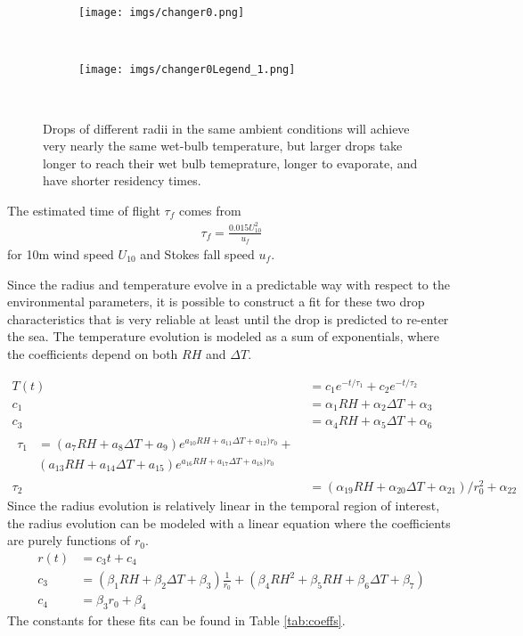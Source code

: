 \documentclass[10pt,a4paper]{article}
\begin{document}
\begin{figure}[h!]
    \centering
    \begin{subfigure}[t!]{0.75\textwidth}
        \texttt{[image: imgs/changer0.png]}        
    \end{subfigure}
    ~ %
    \begin{subfigure}[t!]{0.2\textwidth}
        \texttt{[image: imgs/changer0Legend\_1.png]}        
    \end{subfigure}
    ~ %
       \caption{Drops of different radii in the same ambient conditions will achieve very nearly the same wet-bulb temperature, but larger drops take longer to reach their wet bulb temeprature, longer to evaporate, and have shorter residency times. \label{fig:changer0}}
\end{figure}

The estimated time of flight $\tau_f$ comes from \citet{Andreas1992} 
\begin{align}
\tau_f = \frac{0.015 U_{10}^2}{u_f} \label{eq:tauf}
\end{align}
for 10m wind speed $U_{10}$ and Stokes fall speed $u_f$. \par 
Since the radius and temperature evolve in a predictable way with respect to the environmental parameters, it is possible to construct a fit for these two drop characteristics that is very reliable at least until the drop is predicted to re-enter the sea. The temperature evolution is modeled as a sum of exponentials, where the coefficients depend on both $RH$ and $\Delta T$.

\begin{align}
T(t) &= c_1e^{-t/\tau_1}+c_2e^{-t/\tau_2} \\
c_1 &= \alpha_1 RH + \alpha_2 \Delta T + \alpha_3 \\
c_3 &= \alpha_4 RH + \alpha_5 \Delta T + \alpha_6  \\
\begin{split}
\tau_1 &= (a_7RH+a_8 \Delta T+a_9) e^{a_{10}RH+a_{11}\Delta T+a_{12})r_0}+\\
&(a_{13}RH+a_{14} \Delta T+a_{15}) e^{a_{16}RH+a_{17} \Delta T+a_{18})r_0}
\end{split}\\
\tau_2 &= (\alpha_{19} RH+\alpha_{20} \Delta T+\alpha_{21})/r_0^2+\alpha_{22} 
\end{align}
Since the radius evolution is relatively linear in the temporal region of interest, the radius evolution can be modeled with a linear equation where the coefficients are purely functions of $r_0$.
\begin{align}
 r(t) &= c_3 t + c_4 \\
c_3 &= (\beta_1 RH+\beta_2 \Delta T+\beta_3)\frac{1}{r_0}+(\beta_4 RH^2+\beta_5 RH+\beta_6 \Delta T+\beta_7) \\
c_4 &= \beta_3 r_0+\beta_4 
\end{align}
The constants for these fits can be found in Table \ref{tab:coeffs}.
\end{document}
